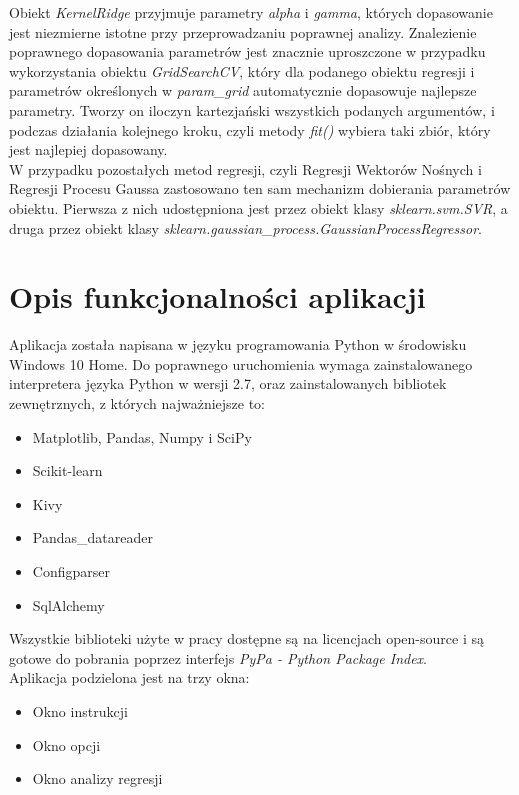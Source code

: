 Obiekt \textit{KernelRidge} przyjmuje parametry \textit{alpha} i \textit{gamma}, których dopasowanie jest niezmierne istotne przy przeprowadzaniu poprawnej analizy.
Znalezienie poprawnego dopasowania parametrów jest znacznie uproszczone w przypadku wykorzystania obiektu \textit{GridSearchCV}, 
który dla podanego obiektu regresji i parametrów określonych w \textit{param\_grid} automatycznie dopasowuje najlepsze parametry.
Tworzy on iloczyn kartezjański wszystkich podanych argumentów, i podczas działania kolejnego kroku, czyli metody \textit{fit()} wybiera taki zbiór, który jest najlepiej dopasowany.\\

W przypadku pozostałych metod regresji, czyli Regresji Wektorów Nośnych i Regresji Procesu Gaussa zastosowano ten sam mechanizm dobierania parametrów obiektu.
Pierwsza z nich udostępniona jest przez obiekt klasy \textit{sklearn.svm.SVR}, a druga przez obiekt klasy \textit{sklearn.gaussian\_process.GaussianProcessRegressor}.


\section{Opis funkcjonalności aplikacji}
Aplikacja została napisana w języku programowania Python w środowisku Windows 10 Home.
Do poprawnego uruchomienia wymaga zainstalowanego interpretera języka Python w wersji 2.7, oraz zainstalowanych bibliotek zewnętrznych, z których najważniejsze to:
\begin{itemize}:
 \item Matplotlib, Pandas, Numpy i SciPy
 \item Scikit-learn
 \item Kivy
 \item Pandas_datareader
 \item Configparser
 \item SqlAlchemy
\end{itemize}

Wszystkie biblioteki użyte w pracy dostępne są na licencjach open-source i są gotowe do pobrania poprzez interfejs \textit{PyPa - Python Package Index}.\\

Aplikacja podzielona jest na trzy okna:
\begin{itemize}
 \item Okno instrukcji
 \item Okno opcji
 \item Okno analizy regresji
\end{itemize}

